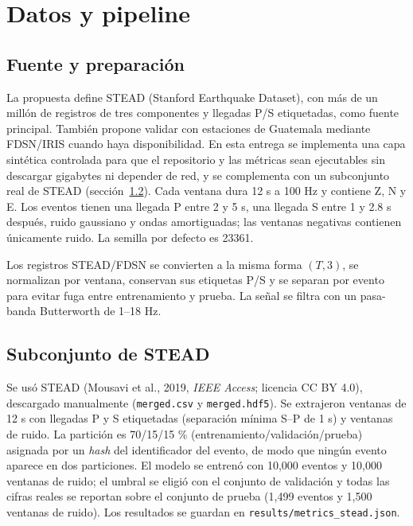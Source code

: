 \documentclass[11pt,letterpaper]{article}
\begin{document}
\section{Datos y pipeline}
\subsection{Fuente y preparación}
La propuesta define STEAD (Stanford Earthquake Dataset), con más de un millón de
registros de tres componentes y llegadas P/S etiquetadas, como fuente principal.
También propone validar con estaciones de Guatemala mediante FDSN/IRIS cuando haya
disponibilidad. En esta entrega se implementa una capa sintética controlada para
que el repositorio y las métricas sean ejecutables sin descargar gigabytes ni
depender de red, y se complementa con un subconjunto real de STEAD
(sección~\ref{sec:stead}). Cada ventana dura 12 s a 100 Hz y contiene Z, N y E. Los eventos
tienen una llegada P entre 2 y 5 s, una llegada S entre 1 y 2.8 s después, ruido
gaussiano y ondas amortiguadas; las ventanas negativas contienen únicamente
ruido. La semilla por defecto es 23361.

Los registros STEAD/FDSN se convierten a la misma forma $(T,3)$, se normalizan
por ventana, conservan sus etiquetas P/S y se separan por evento para evitar fuga
entre entrenamiento y prueba. La señal se filtra con un pasa-banda Butterworth de
1--18 Hz.

\subsection{Subconjunto de STEAD}\label{sec:stead}
Se usó STEAD (Mousavi et al., 2019, \textit{IEEE Access}; licencia CC BY 4.0),
descargado manualmente (\texttt{merged.csv} y \texttt{merged.hdf5}). Se extrajeron
ventanas de 12 s con llegadas P y S etiquetadas (separación mínima S--P de 1 s) y
ventanas de ruido. La partición es 70/15/15 \% (entrenamiento/validación/prueba)
asignada por un \textit{hash} del identificador del evento, de modo que ningún
evento aparece en dos particiones. El modelo se entrenó con 10,000 eventos y
10,000 ventanas de ruido; el umbral se eligió con el conjunto de validación y todas
las cifras reales se reportan sobre el conjunto de prueba (1,499 eventos y 1,500
ventanas de ruido). Los resultados se guardan en
\texttt{results/metrics\_stead.json}.
\end{document}

